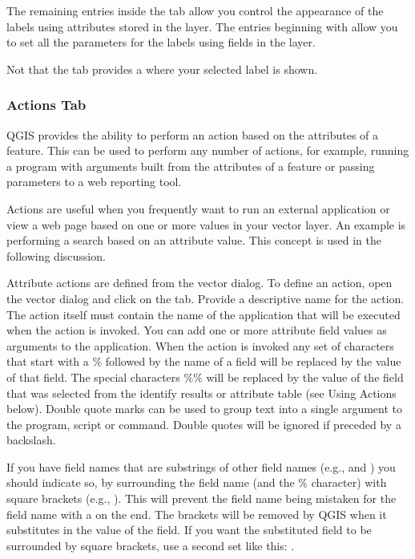 The remaining entries inside the  tab allow you control the appearance of the
labels using attributes stored in the layer. The entries beginning with  allow you to
set all the parameters for the labels using fields in the layer.

Not that the  tab provides a  where your
selected label is shown.

\subsubsection{Actions Tab}\label{label_actions}

QGIS provides the ability to perform an action based on the attributes of a
feature. This can be used to perform any number of actions, for example,
running a program with arguments built from the attributes of a feature or
passing parameters to a web reporting tool.

Actions are useful when you frequently want to run an external application or
view a web page based on one or more values in your vector layer. An example
is performing a search based on an attribute value. This concept is used in 
the following discussion.


Attribute actions are defined from the vector  dialog. To
define an action, open the vector  dialog and click on the
 tab. Provide a descriptive name for the action. The action
itself must contain the name of the application that will be executed when the
action is invoked. You can add one or more attribute field values as arguments
to the application. When the action is invoked any set of characters that
start with a \% followed by the name of a field will be replaced by the value of
that field. The special characters \%\% \index{\%\%}will be replaced by the value
of the field that was selected from the identify results or attribute table (see
Using Actions below).  Double quote marks can be used to group text into a
single argument to the program, script or command. Double quotes will be
ignored if preceded by a backslash.

If you have field names that are substrings of other field names (e.g., 
and ) you should
indicate so, by surrounding the field name (and the \% character) with square
brackets (e.g., \usertext{[\%col10]}). This will prevent the  field
name being mistaken for the  field name with a 
on the end. The brackets will be removed by QGIS when it substitutes in the
value of the field. If you want the substituted field to be surrounded by square
brackets, use a second set like this: \usertext{[[\%col10]]}.

